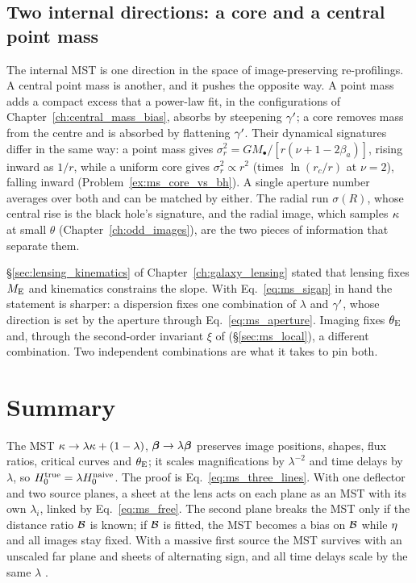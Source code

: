 \subsection{Two internal directions: a core and a central point mass}
\label{sec:ms_core_bh}

The internal MST is one direction in the space of image-preserving
re-profilings.  A central point mass is another, and it pushes the opposite
way.  A point mass adds a compact excess that a power-law fit, in the
configurations of Chapter~\ref{ch:central_mass_bias}, absorbs by
steepening $\gamma'$; a core removes mass
from the centre and is absorbed by flattening $\gamma'$.  Their dynamical
signatures differ in the same way: a point mass gives
$\sigma_r^2=GM_\bullet/[r(\nu+1-2\beta_a)]$, rising inward as $1/r$, while a
uniform core gives $\sigma_r^2\propto r^2$ (times $\ln(r_c/r)$ at $\nu=2$),
falling inward
(Problem~\ref{ex:ms_core_vs_bh}).  A single aperture number averages over
both and can be matched by either.  The radial run $\sigma(R)$, whose central
rise is the black hole's signature, and the radial image, which samples
$\kappa$ at small $\theta$ (Chapter~\ref{ch:odd_images}), are the two pieces
of information that separate them.

\begin{bridge}
\S\ref{sec:lensing_kinematics} of Chapter~\ref{ch:galaxy_lensing} stated that
lensing fixes $M_{\rm E}$ and kinematics constrains the slope.  With
Eq.~\eqref{eq:ms_sigap} in hand the statement is sharper: a dispersion fixes
one combination of $\lambda$ and $\gamma'$, whose direction is set by the aperture
through Eq.~\eqref{eq:ms_aperture}.  Imaging fixes $\theta_{\mathrm{E}}$ and, through the
second-order invariant $\xi$ of \citet{kochanek_2020}
(\S\ref{sec:ms_local}), a different combination.  Two independent combinations are what it takes to pin both.
\end{bridge}


\section{Summary}
\label{sec:ms_summary}

The MST $\kappa\to\lambda\kappa+(1-\lambda)$, $\boldsymbol{\beta}\to\lambda\boldsymbol{\beta}$
preserves image positions, shapes, flux ratios, critical curves and
$\theta_{\mathrm{E}}$; it scales magnifications by $\lambda^{-2}$ and time delays by
$\lambda$, so $H_0^{\rm true}=\lambda H_0^{\rm naive}$.  The proof is
Eq.~\eqref{eq:ms_three_lines}.  With one deflector and two source planes, a
sheet at the lens acts on each plane as an MST with its own $\lambda_i$,
linked by Eq.~\eqref{eq:ms_free}.  The second plane breaks the MST only if
the distance ratio $\mathcal{B}$ is known; if $\mathcal{B}$ is fitted, the MST becomes a
bias on $\mathcal{B}$ while $\eta$ and all images stay fixed.  With a massive
first source the MST survives with an unscaled far plane and sheets of
alternating sign, and all time delays scale by the same $\lambda$
\citep{schneider_2014_multiplane,schneider_2019_generalized}.

